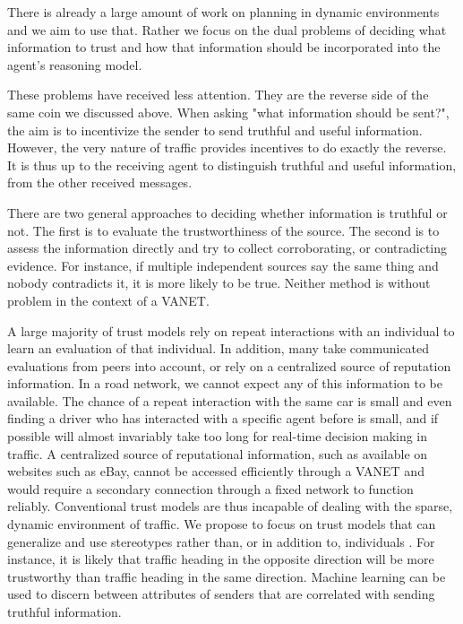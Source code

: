 \documentclass{article}
\begin{document}
There is already a large amount of work on planning in dynamic environments \cite{Buriol2008} and we aim to use that. Rather we focus on the dual problems of deciding what information to trust and how that information should be incorporated into the agent's reasoning model.

These problems have received less attention. They are the reverse side of the same coin we discussed above. When asking "what information should be sent?", the aim is to incentivize the sender to send truthful and useful information. However, the very nature of traffic provides incentives to do exactly the reverse. It is thus up to the receiving agent to distinguish truthful and useful information, from the other received messages.

There are two general approaches to deciding whether information is truthful or not. The first is to evaluate the trustworthiness of the source. The second is to assess the information directly and try to collect corroborating, or contradicting evidence. For instance, if multiple independent sources say the same thing and nobody contradicts it, it is more likely to be true. Neither method is without problem in the context of a VANET.

A large majority of trust models rely on repeat interactions with an individual to learn an evaluation of that individual. In addition, many take communicated evaluations from peers into account, or rely on a centralized source of reputation information. In a road network, we cannot expect any of this information to be available. The chance of a repeat interaction with the same car is small and even finding a driver who has interacted with a specific agent before is small, and if possible will almost invariably take too long for real-time decision making in traffic. A centralized source of reputational information, such as available on websites such as eBay, cannot be accessed efficiently through a VANET and would require a secondary connection through a fixed network to function reliably. Conventional trust models are thus incapable of dealing with the sparse, dynamic environment of traffic. We propose to focus on trust models that can generalize and use stereotypes rather than, or in addition to, individuals \cite{Burnett2010}. For instance, it is likely that traffic heading in the opposite direction will be more trustworthy than traffic heading in the same direction. Machine learning can be used to discern between attributes of senders that are correlated with sending truthful information.
\end{document}
